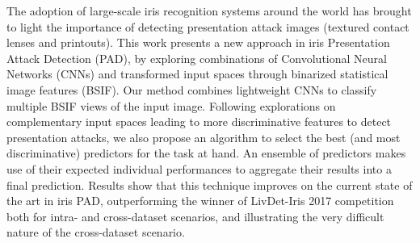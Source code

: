The adoption of large-scale iris recognition systems around the world has brought to light the importance of detecting presentation attack images (textured contact lenses and printouts).
This work presents a new approach in iris Presentation Attack Detection (PAD), by exploring combinations of Convolutional Neural Networks (CNNs) and transformed input spaces through 
binarized statistical image features (BSIF). Our method combines lightweight CNNs to classify multiple BSIF views of the input image. Following explorations on complementary input spaces leading to more discriminative features to detect presentation attacks, we also propose an algorithm to select the best (and most discriminative) predictors for the task at hand. An ensemble of predictors makes use of their expected individual performances to aggregate their results into a final prediction. Results show that this technique improves on the current state of the art in iris PAD, outperforming the winner of LivDet-Iris 2017 competition both for intra- and cross-dataset scenarios, and illustrating the very difficult nature of the cross-dataset scenario.